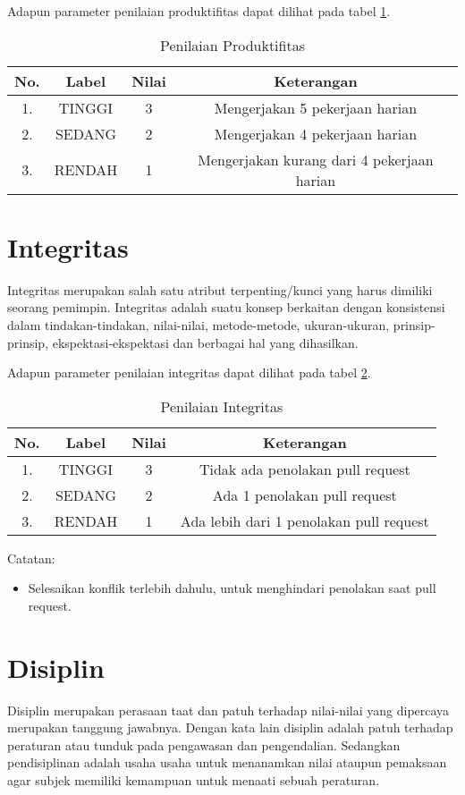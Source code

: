 Adapun parameter penilaian produktifitas dapat dilihat pada tabel \ref{tab:nilaiproduktifitas}.

\begin{table}[H]
\caption{Penilaian Produktifitas}
\centering
\begin{tabular}{|c|c|c|c|}
\hline
\textbf{No.}&\textbf{Label}&\textbf{Nilai}&\textbf{Keterangan}\\
\hline
1.&TINGGI&3&Mengerjakan 5 pekerjaan harian\\
\hline
2.&SEDANG&2&Mengerjakan 4 pekerjaan harian\\
\hline
3.&RENDAH&1&Mengerjakan kurang dari 4 pekerjaan harian\\
\hline
\end{tabular}
\label{tab:nilaiproduktifitas}
\end{table}

\section{Integritas}
Integritas merupakan salah satu atribut terpenting/kunci yang harus dimiliki seorang pemimpin. Integritas adalah suatu konsep berkaitan dengan konsistensi dalam tindakan-tindakan, nilai-nilai, metode-metode, ukuran-ukuran, prinsip-prinsip, ekspektasi-ekspektasi dan berbagai hal yang dihasilkan.

Adapun parameter penilaian integritas dapat dilihat pada tabel \ref{tab:nilaiintegritas}.

\begin{table}[H]
\caption{Penilaian Integritas}
\centering
\begin{tabular}{|c|c|c|c|}
\hline
\textbf{No.}&\textbf{Label}&\textbf{Nilai}&\textbf{Keterangan}\\
\hline
1.&TINGGI&3&Tidak ada penolakan pull request\\
\hline
2.&SEDANG&2&Ada 1 penolakan pull request\\
\hline
3.&RENDAH&1&Ada lebih dari 1 penolakan pull request\\
\hline
\end{tabular}
\label{tab:nilaiintegritas}
\end{table}

Catatan:
\begin{itemize}
\item Selesaikan konflik terlebih dahulu, untuk menghindari penolakan saat pull request.
\end{itemize}

\section{Disiplin}
Disiplin merupakan perasaan taat dan patuh terhadap nilai-nilai yang dipercaya merupakan tanggung jawabnya. Dengan kata lain disiplin adalah patuh terhadap peraturan atau tunduk pada pengawasan dan pengendalian. Sedangkan pendisiplinan adalah usaha usaha untuk menanamkan nilai ataupun pemaksaan agar subjek memiliki kemampuan untuk menaati sebuah peraturan.

